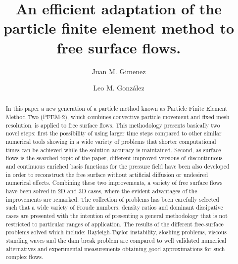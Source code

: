 \documentclass[review]{elsarticle}
\begin{document}
\begin{frontmatter}

\title{An efficient adaptation of the particle finite element method to free surface flows.}

\author{Juan M. Gimenez}
\address{CIMEC, Santa Fe, Argentina}
\author{Leo M. Gonz\'{a}lez}
\address{UPM, Madrid, Spain}

%
%
%

\begin{abstract}
In this paper a new generation of a particle method known as Particle Finite Element Method Two (PFEM-2), which combines convective particle movement and fixed mesh resolution, is applied to free surface flows. This methodology presents basically two novel steps: first the possibility of using larger time steps compared to other similar numerical tools showing in a wide variety of problems that shorter computational times can be achieved while the solution accuracy is maintained. Second, as surface flows is the searched topic of the paper, different improved versions of discontinuous and continuous enriched basis functions for the pressure field have been also developed in order to reconstruct the free surface without artificial diffusion or undesired numerical effects. Combining these two improvements, a variety of free surface flows have been solved in 2D and 3D cases, where the evident advantages of the improvements are remarked. The collection of problems has been carefully selected such that a wide
variety of Froude numbers, density ratios
and dominant dissipative cases are presented with the intention of presenting a general methodology that is not restricted to particular ranges of application.
The results of the different free-surface problems solved which include: Rayleigh-Taylor instability, sloshing problems, viscous standing waves and the dam break problem are compared to well validated numerical alternatives and experimental measurements obtaining
good approximations for such complex flows.
\end{abstract}


\end{frontmatter}
\end{document}
